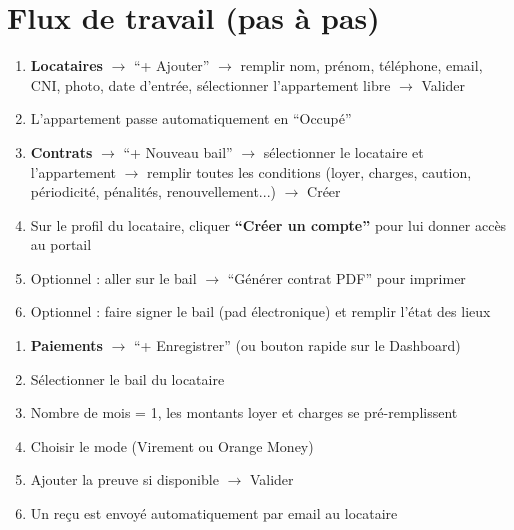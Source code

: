 \documentclass[12pt,a4paper]{article}
\begin{document}
\newpage
\section{Flux de travail (pas \`a pas)}

\begin{flowbox}
\begin{enumerate}
\item \textbf{Locataires} $\rightarrow$ ``+ Ajouter'' $\rightarrow$ remplir nom, pr\'enom, t\'el\'ephone, email, CNI, photo, date d'entr\'ee, s\'electionner l'appartement libre $\rightarrow$ Valider
\item L'appartement passe automatiquement en ``Occup\'e''
\item \textbf{Contrats} $\rightarrow$ ``+ Nouveau bail'' $\rightarrow$ s\'electionner le locataire et l'appartement $\rightarrow$ remplir toutes les conditions (loyer, charges, caution, p\'eriodicit\'e, p\'enalit\'es, renouvellement...) $\rightarrow$ Cr\'eer
\item Sur le profil du locataire, cliquer \textbf{``Cr\'eer un compte''} pour lui donner acc\`es au portail
\item Optionnel : aller sur le bail $\rightarrow$ ``G\'en\'erer contrat PDF'' pour imprimer
\item Optionnel : faire signer le bail (pad \'electronique) et remplir l'\'etat des lieux
\end{enumerate}
\end{flowbox}

\begin{flowbox}
\begin{enumerate}
\item \textbf{Paiements} $\rightarrow$ ``+ Enregistrer'' (ou bouton rapide sur le Dashboard)
\item S\'electionner le bail du locataire
\item Nombre de mois = 1, les montants loyer et charges se pr\'e-remplissent
\item Choisir le mode (Virement ou Orange Money)
\item Ajouter la preuve si disponible $\rightarrow$ Valider
\item Un re\c{c}u est envoy\'e automatiquement par email au locataire
\end{enumerate}
\end{flowbox}
\end{document}
